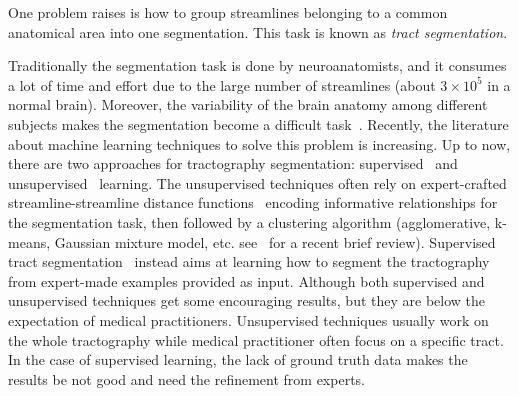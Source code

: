 One problem raises is how to group streamlines belonging to a common anatomical area into one segmentation. This task is known as \emph{tract segmentation}.

Traditionally the segmentation task is done by neuroanatomists, and it consumes a lot of time and effort due to the large number of streamlines (about $3 \times 10^5$ in a normal brain). Moreover, the variability of the brain anatomy among different subjects makes the segmentation become a difficult task~\cite{bozzali2002white}. Recently, the literature about machine learning techniques to solve this problem is increasing. Up to now, there are two approaches for tractography segmentation: supervised~\cite{caruna2006emperical} and unsupervised~\cite{ghahramani2004unsupervised} learning. The unsupervised techniques often rely on expert-crafted streamline-streamline distance functions~\cite{dubuisson1994modified, zhang2008identifying} encoding informative relationships for the segmentation task, then followed by a clustering algorithm (agglomerative, k-means, Gaussian mixture model, etc. see~\cite{wang2011tractography} for a recent brief review). Supervised tract segmentation~\cite{caruna2006emperical,olivetti2011supervised} instead aims at learning how to segment the tractography from expert-made examples provided as input. Although both supervised and unsupervised techniques get some encouraging results, but they are below the expectation of medical practitioners. Unsupervised techniques usually work on the whole tractography while medical practitioner often focus on a specific tract. In the case of supervised learning, the lack of ground truth data makes the results be not good and need the refinement from experts. 

